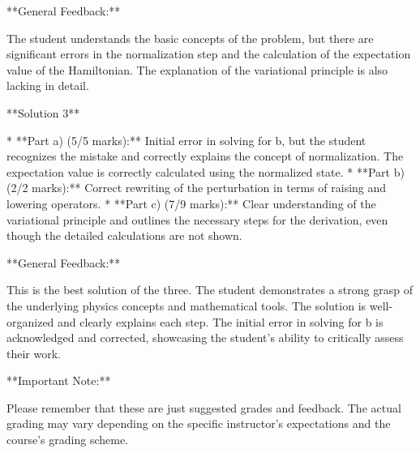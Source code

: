 \documentclass[a4paper,11pt]{article}
\begin{document}
**General Feedback:**

The student understands the basic concepts of the problem, but there are significant errors in the normalization step and the calculation of the expectation value of the Hamiltonian. The explanation of the variational principle is also lacking in detail.

**Solution 3**

* **Part a) (5/5 marks):**  Initial error in solving for b, but the student recognizes the mistake and correctly explains the concept of normalization. The expectation value is correctly calculated using the normalized state.
* **Part b) (2/2 marks):** Correct rewriting of the perturbation in terms of raising and lowering operators.
* **Part c) (7/9 marks):** Clear understanding of the variational principle and outlines the necessary steps for the derivation, even though the detailed calculations are not shown.

**General Feedback:**

This is the best solution of the three. The student demonstrates a strong grasp of the underlying physics concepts and mathematical tools. The solution is well-organized and clearly explains each step. The initial error in solving for b is acknowledged and corrected, showcasing the student's ability to critically assess their work.

**Important Note:**

Please remember that these are just suggested grades and feedback. The actual grading may vary depending on the specific instructor's expectations and the course's grading scheme. 
\end{document}
